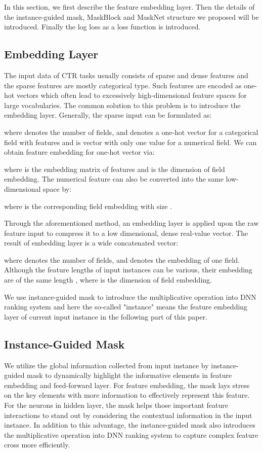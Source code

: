 \documentclass[sigconf]{acmart}
\begin{document}
In this section, we first describe the feature embedding layer. Then the details of the instance-guided mask, MaskBlock and MaskNet structure we proposed will be introduced. Finally the log loss as a loss function is introduced.



\subsection{Embedding Layer}
The input data of CTR tasks usually consists of sparse and dense features and the sparse features are mostly categorical type. Such features are  encoded as one-hot vectors which often lead to excessively high-dimensional feature spaces for large vocabularies. The common solution to this problem is to introduce the embedding layer. Generally, the sparse input can be formulated as:

where  denotes the number of fields, and  denotes a one-hot vector for a categorical  field with  features and  is vector with only one value for a numerical  field. We can obtain feature embedding  for one-hot vector  via:

where  is the embedding matrix of  features and  is the dimension of field embedding. The numerical feature  can also be converted into the same low-dimensional space by:

where  is the corresponding field embedding with size .


Through the aforementioned method, an embedding layer is applied upon the raw feature input to compress it to a low dimensional, dense real-value vector. The result of embedding layer is a wide concatenated vector:


where  denotes the number of fields, and   denotes the embedding of one field. Although the feature lengths of input instances can be various, their embedding are of the same length , where  is the dimension of field embedding.

We use instance-guided mask to introduce the multiplicative operation into DNN ranking system and here the so-called "instance" means the feature embedding layer of current input instance in the following part of this paper.


\subsection{Instance-Guided Mask}
We utilize the global information collected from input instance by instance-guided mask to dynamically highlight the informative elements in feature embedding and feed-forward layer. For feature embedding, the mask lays stress on the key elements with more information to effectively represent this feature. For the neurons in hidden layer, the mask helps those important feature interactions to stand out by considering the contextual information in the input instance. In addition to this advantage, the instance-guided mask also introduces the multiplicative operation into DNN ranking system to capture complex feature cross more efficiently.
\end{document}

